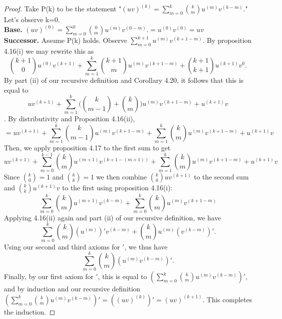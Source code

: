 \documentclass[12pt]{amsart}
\begin{document}
\begin{proof}
	Take P(k) to be the statement "$(uv)^{(k)} = \sum_{m=0}^{k} {{k}\choose{m}} u^{(m)}v^{(k-m)}.$" Let's observe k=0.
	\\\textbf{Base.} $(uv)^{(0)} = \sum_{m=0}^{0} {{0}\choose{m}} u^{(m)}v^{(0-m)}. = u^{(0)}v^{(0)} = uv$
	\\\textbf{Successor.} Assume P(k) holds. Observe $\sum\limits_{m=0}^{k+1}u^{(m)}v^{(k+1 - m)}$. By proposition 4.16(i) we may rewrite this as $${{k+1}\choose{0}}u^{(0)}v^{(k+1)} + \sum\limits_{m=1}^{k} {{k+1}\choose{m}} u^{(m)}v^{(k+1-m)} +{{k+1}\choose{k+1}} u^{(k+1)}v^{0}.$$ By part (ii) of our recursive definition and Corollary 4.20, it follows that this is equal to $$uv^{(k+1)} + \sum\limits_{m=1}^{k} \Bigg({{k}\choose{m-1}} +{{k}\choose{m}}\Bigg) u^{(m)}v^{(k+1-m)} +u^{(k+1)}v$$. By distributivity and Proposition 4.16(ii), $$ = uv^{(k+1)} + \sum\limits_{m=1}^{k} {{k}\choose{m-1}}u^{(m)}v^{(k+1-m)} + \sum\limits_{m=1}^{k}{{k}\choose{m}} u^{(m)}v^{(k+1-m)} +u^{(k+1)}v$$
	Then, we apply proposition 4.17 to the first sum to get  $$ uv^{(k+1)} + \sum\limits_{m=0}^{k-1} {{k}\choose{m}}u^{(m+1)}v^{(k+1-(m+1))} + \sum\limits_{m=1}^{k}{{k}\choose{m}} u^{(m)}v^{(k+1-m)} +u^{(k+1)}v$$
	Since ${{k}\choose{0}} = 1$ and ${{k}\choose{k}} = 1$ we then combine ${{k}\choose{0}}uv^{(k+1)}$ to the second sum and ${{k}\choose{k}}u^{(k+1)}v$ to the first using proposition 4.16(i): $$\sum\limits_{m=0}^{k} {{k}\choose{m}}u^{(m+1)}v^{(k-m)} + \sum\limits_{m=0}^{k}{{k}\choose{m}} u^{(m)}v^{(k+1-m)}$$
	Applying 4.16(ii) again and part (ii) of our recursive definition, we have $$\sum\limits_{m=0}^{k} {{k}\choose{m}}(u^{(m)})'v^{(k-m)} + {{k}\choose{m}} u^{(m)}(v^{(k-m)})'.$$ Using our second and third axioms for $'$, we thus have $$\sum\limits_{m=0}^{k} {{k}\choose{m}}(u^{(m)}v^{(k-m)})'.$$ Finally, by our first axiom for $'$, this is equal to $(\sum\limits_{m=0}^{k} {{k}\choose{m}}u^{(m)}v^{(k-m)})'$, and by induction and our recursive definition $(\sum\limits_{m=0}^{k} {{k}\choose{m}}u^{(m)}v^{(k-m)})' = ((uv)^{(k)})' = (uv)^{(k+1)}$. This completes the induction.
\end{proof}
\end{document}

